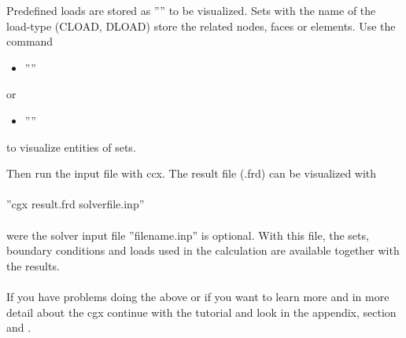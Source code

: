 \documentclass{article}
\begin{document}
Predefined loads are stored as '''' to be visualized. Sets with the name of the load-type (CLOAD, DLOAD) store the related nodes, faces or elements. Use the command
\begin{itemize}
\item ''''
\end{itemize}
or
\begin{itemize}
\item ''''
\end{itemize}
to visualize entities of sets.

Then run the input file with ccx. The result file (.frd) can be visualized with\\\\  ''cgx result.frd solverfile.inp''\\\\were the solver input file ''filename.inp'' is optional. With this file, the sets, boundary conditions and loads used in the calculation are available together with the results.\\\\If you have problems doing the above or if you want to learn more and in more detail about the cgx continue with the tutorial \cite{tutorial} and look in the appendix, section  and .    
\end{document}
